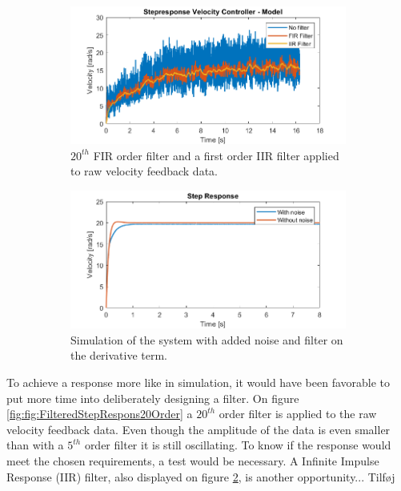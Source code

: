\documentclass[../../main.tex]{subfiles}
\begin{document}
\begin{figure}[H]
     \centering
     \begin{subfigure}[b]{0.49\textwidth}
         \centering
    \includegraphics[width=\textwidth]{Sections/Miscellaneous/Images/FilteredStepRespons20Order.png}
    \caption{$20^{th}$ FIR order filter and a first order IIR filter applied to raw velocity feedback data.}
    \label{fig:FilteredStepRespons20Order}
     \end{subfigure}
     \hfill
     \begin{subfigure}[b]{0.49\textwidth}
         \centering
         \includegraphics[width=\textwidth]{Sections/Miscellaneous/Images/StepResponsNoiseAndFilter.png}
         \caption{Simulation of the system with added noise and filter on the derivative term.}
         \label{fig:StepResponsAddedNoiseAndFilter}
     \end{subfigure}
        \caption{}
        \label{fig:FilterDiskussionImplementedFilter20}
\end{figure}
To achieve a response more like in simulation, it would have been favorable to put more time into deliberately designing a filter. On figure \ref{fig:fig:FilteredStepRespons20Order} a $20^{th}$ order filter is applied to the raw velocity feedback data. Even though the amplitude of the data is even smaller than with a $5^{th}$ order filter it is still oscillating. To know if the response would meet the chosen requirements, a test would be necessary. A Infinite Impulse Response (IIR) filter, also displayed on figure \ref{fig:StepResponsAddedNoiseAndFilter}, is another opportunity... Tilføj
\end{document}
